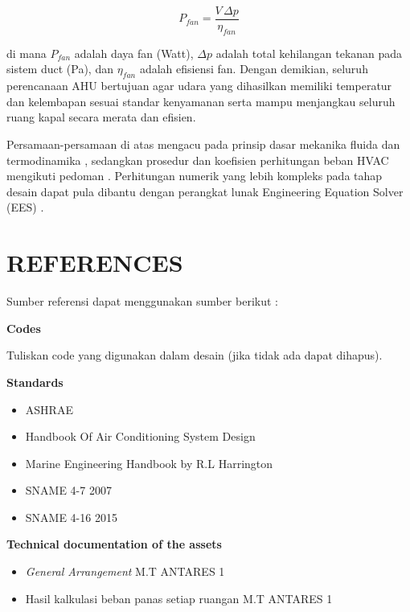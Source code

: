 \documentclass[12pt,a4paper,twoside,openright]{book}
\theoremstyle{definition}
\theoremstyle{plain}
\theoremstyle{remark}
\begin{document}
\begin{equation}
P_{fan} = \dfrac{V \, \Delta p}{\eta_{fan}}
\end{equation}

di mana $P_{fan}$ adalah daya fan (Watt), $\Delta p$ adalah total kehilangan tekanan pada sistem duct (Pa), dan $\eta_{fan}$ adalah efisiensi fan. Dengan demikian, seluruh perencanaan AHU bertujuan agar udara yang dihasilkan memiliki temperatur dan kelembapan sesuai standar kenyamanan serta mampu menjangkau seluruh ruang kapal secara merata dan efisien.

Persamaan-persamaan di atas mengacu pada prinsip dasar mekanika fluida dan termodinamika \citep{cengel2018}, sedangkan prosedur dan koefisien perhitungan beban HVAC mengikuti pedoman \citet{ashrae2018}. Perhitungan numerik yang lebih kompleks pada tahap desain dapat pula dibantu dengan perangkat lunak Engineering Equation Solver (EES) \citep{kleinnellis2014}.


\chapter{REFERENCES}

Sumber referensi dapat menggunakan sumber berikut :

\medskip
\noindent\textbf{Codes}

\noindent Tuliskan code yang digunakan dalam desain (jika tidak ada dapat dihapus).

\medskip
\noindent\textbf{Standards}

\begin{itemize}
  \item ASHRAE
  \item Handbook Of Air Conditioning System Design
  \item Marine Engineering Handbook by R.L Harrington
  \item SNAME 4-7 2007
  \item SNAME 4-16 2015
\end{itemize}

\medskip
\noindent\textbf{Technical documentation of the assets}

\begin{itemize}
  \item \textit{General Arrangement} M.T ANTARES 1
  \item Hasil kalkulasi beban panas setiap ruangan M.T ANTARES 1
\end{itemize}
\end{document}
